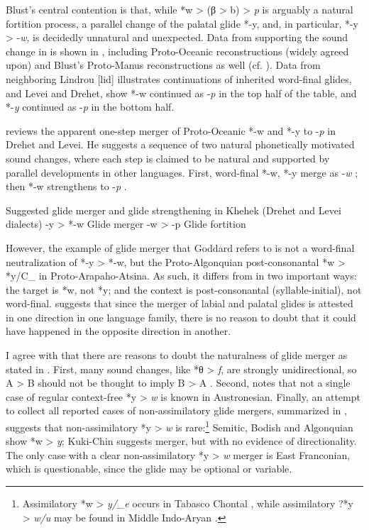 \documentclass[output=paper]{langscibook}
\begin{document}
\largerpage
Blust’s central contention is that, while *w > (β > b) > \textit{p} is arguably a natural fortition process, a parallel change of the palatal glide *-y, and, in particular, *-y > -\textit{w}, is decidedly unnatural and unexpected. Data from \citet[230--231]{Blust2005} supporting the sound change in  is shown in , including Proto-Oceanic reconstructions (widely agreed upon) and Blust’s Proto-Manus reconstructions as well (cf. \citealt[659--660]{Blust2013}). Data from neighboring Lindrou [lid] illustrates continuations of inherited word-final glides, and Levei and Drehet, show *-w continued as -\textit{p} in the top half of the table, and *-\textit{y} continued as -\textit{p} in the bottom half.


\citet{Goddard2007} reviews the apparent one-step merger of Proto-Oceanic *-w and *-y to -\textit{p} in Drehet and Levei. He suggests a sequence of two natural phonetically motivated sound changes, where each step is claimed to be natural and supported by parallel developments in other languages. First, word-final *-w, *-y merge as -\textit{w} ; then *-w strengthens to -\textit{p} .

\ea%
\label{ex:blevins:3}Suggested glide merger and glide strengthening in Khehek (Drehet and Levei dialects)
\ea *-y > *-w \tab  Glide merger\label{ex:blevins:3i}
\ex *-w > -p \tab  Glide fortition\label{ex:blevins:3ii}
\z
\z

However, the example of glide merger that Goddard refers to is not a word-final neutralization of *-y > *-w, but the Proto-Algonquian post-consonantal *w > *y/C\_ in Proto-Arapaho-Atsina. As such, it differs from  in two important ways: the target is *w, not *y; and the context is post-consonantal (syllable-initial), not word-final. \citet[117]{Goddard2007} suggests that since the merger of labial and palatal glides is attested in one direction in one language family, there is no reason to doubt that it could have happened in the opposite direction in another. 

I agree with \citet{Blust2005,Blust2018} that there are reasons to doubt the naturalness of glide merger as stated in . First, many sound changes, like *θ > \textit{f}, are strongly unidirectional, so A > B should not be thought to imply B > A \citep{Blevins2019}. Second, \citet{Blust2018} notes that not a single case of regular context-free *y > \textit{w} is known in Austronesian. Finally, an attempt to collect all reported cases of non-assimilatory glide mergers, summarized in , suggests that non-assimilatory *y > \textit{w} is rare:\footnote{Assimilatory *w > \textit{y/\_e} occurs in Tabasco Chontal \citep{Justeson1985}, while assimilatory ?*y > \textit{w/u} may be found in Middle Indo-Aryan \citep[243]{Kümmel2007}.} Semitic, Bodish and Algonquian show *w > \textit{y}; Kuki-Chin suggests merger, but with no evidence of directionality. The only case with a clear non-assimilatory *y > \textit{w} merger is East Franconian, which is questionable, since the glide may be optional or variable.
\end{document}
